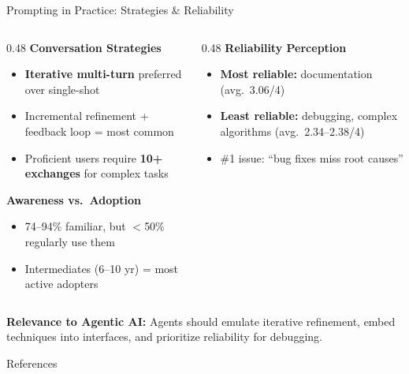 \documentclass[
11pt,notheorems,hyperref={pdfauthor=whatever}
]{beamer}
\begin{document}
\begin{frame}{Prompting in Practice: Strategies \& Reliability}
	\begin{columns}[T]
		\begin{column}{0.48\textwidth}
			\textbf{Conversation Strategies}
			\begin{itemize}
				\item \textbf{Iterative multi-turn} preferred over single-shot
				\item Incremental refinement + feedback loop = most common
				\item Proficient users require \textbf{10+ exchanges} for complex tasks
			\end{itemize}

			\vspace{0.2cm}

			\textbf{Awareness vs.\ Adoption}
			\begin{itemize}
				\item 74--94\% familiar, but $<$50\% regularly use them
				\item Intermediates (6--10 yr) = most active adopters
			\end{itemize}
		\end{column}
		\hfill
		\begin{column}{0.48\textwidth}
			\textbf{Reliability Perception}
			\begin{itemize}
				\item \textbf{Most reliable:} documentation (avg.\ 3.06/4)
				\item \textbf{Least reliable:} debugging, complex algorithms (avg.\ 2.34--2.38/4)
				\item \#1 issue: ``bug fixes miss root causes''
			\end{itemize}
		\end{column}
	\end{columns}

	\vspace{0.3cm}

	\textbf{Relevance to Agentic AI:} Agents should emulate iterative refinement, embed techniques into interfaces, and prioritize reliability for debugging.
\end{frame}


\begin{frame}[allowframebreaks]{References}
	\nocite{*}
	\printbibliography
\end{frame}
\end{document}
